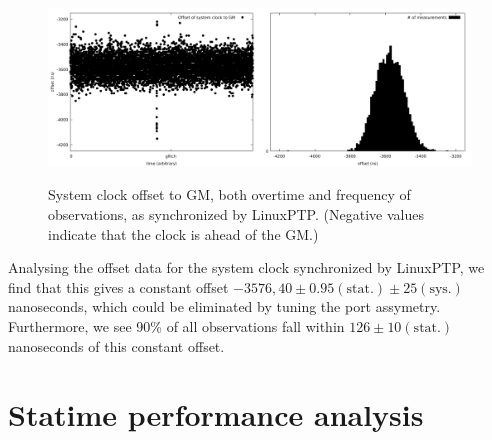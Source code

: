 \documentclass{article}
\begin{document}
\begin{figure}[h]
\includegraphics[width=0.5\textwidth]{gm_ref_offset_overtime.pdf}\includegraphics[width=0.5\textwidth]{gm_ref_offset.pdf}
\caption{System clock offset to GM, both overtime and frequency of observations, as synchronized by LinuxPTP. (Negative values indicate that the clock is ahead of the GM.)}
\label{fig:ref_sys_offset}
\end{figure}

Analysing the offset data for the system clock synchronized by LinuxPTP, we find that this gives a constant offset $-3576,40\pm 0.95 (\text{stat.}) \pm 25(\text{sys.})$ nanoseconds, which could be eliminated by tuning the port assymetry. Furthermore, we see 90\% of all observations fall within $126 \pm 10 (\text{stat.})$ nanoseconds of this constant offset.

\section{Statime performance analysis}
\end{document}
